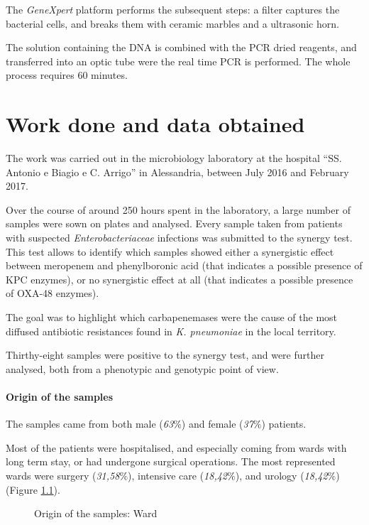 \documentclass[11pt]{report}
\begin{document}
The \emph{GeneXpert} platform performs the subsequent steps: a filter captures the bacterial cells, and breaks them with ceramic marbles and a ultrasonic horn.

The solution containing the DNA is combined with the PCR dried reagents, and transferred into an optic tube were the real time PCR is performed.
The whole process requires 60 minutes.

\chapter{Work done and data obtained}

The work was carried out in the microbiology laboratory at the hospital ``SS. Antonio e Biagio e C. Arrigo'' in Alessandria, between July 2016 and February 2017.

Over the course of around 250 hours spent in the laboratory, a large number of samples were sown on plates and analysed.
Every sample taken from patients with suspected \emph{Enterobacteriaceae} infections was submitted to the synergy test.
This test allows to identify which samples showed either a synergistic effect between meropenem and phenylboronic acid (that indicates a possible presence of KPC enzymes), or no synergistic effect at all (that indicates a possible presence of OXA-48 enzymes).

The goal was to highlight which carbapenemases were the cause of the most diffused antibiotic resistances found in \emph{K. pneumoniae} in the local territory.

Thirthy-eight samples were positive to the synergy test, and were further analysed, both from a phenotypic and genotypic point of view.

\clearpage

\subsubsection{Origin of the samples}

The samples came from both male (\emph{63$\%$}) and female (\emph{37$\%$}) patients.

Most of the patients were hospitalised, and especially coming from wards with long term stay, or had undergone surgical operations.
The most represented wards were surgery (\emph{31,58$\%$}), intensive care (\emph{18,42$\%$}), and urology (\emph{18,42$\%$}) (Figure \ref{wards}).

\begin{figure}[h!]
\centering
{}
\caption{Origin of the samples: Ward}
\label{wards}
\end{figure}
\end{document}
